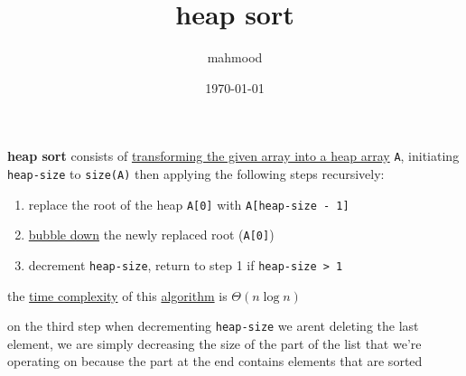 \documentclass[a4paper,12pt]{article}
\author{mahmood}
\date{\today}
\title{heap sort}
\begin{document}
\maketitle
\textbf{heap sort} consists of \href{data_structures.org}{transforming the given array into a heap array} \texttt{A}, initiating \texttt{heap-size} to \texttt{size(A)} then applying the following steps recursively:\\
\begin{enumerate}
\item replace the root of the heap \texttt{A[0]} with \texttt{A[heap-size - 1]}\\
\item \href{data_structures.org}{bubble down} the newly replaced root (\texttt{A[0]})\\
\item decrement \texttt{heap-size}, return to step 1 if \texttt{heap-size > 1}\\
\end{enumerate}
\begin{lemma}
the \href{20221130014441-time_complexity.org}{time complexity} of this \href{20220706211958-algorithm.org}{algorithm} is \(\Theta(n\log n)\)\\
\end{lemma}
\begin{note}
on the third step when decrementing \texttt{heap-size} we arent deleting the last element, we are simply decreasing the size of the part of the list that we're operating on because the part at the end contains elements that are sorted\\
\end{note}
\end{document}
